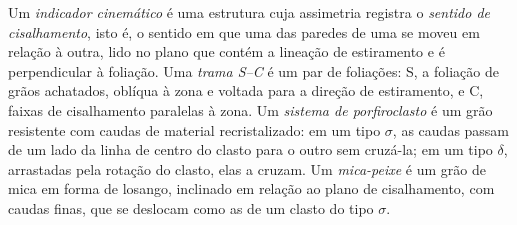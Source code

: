 \begin{definition}\label{def:b3:deformation-mechanisms:kinematic}
Um \emph{indicador cinemático} é uma estrutura cuja
assimetria registra o \emph{sentido de cisalhamento}, isto é, o sentido em
que uma das paredes de uma  se moveu em relação à outra, lido no plano
que contém a lineação de estiramento e é perpendicular à foliação.
Uma \emph{trama S--C} é um par de foliações: S, a
foliação de grãos achatados, oblíqua à zona e voltada para a
direção de estiramento, e C, faixas de cisalhamento paralelas à zona. Um
\emph{sistema de porfiroclasto} é um grão resistente com
caudas de material recristalizado: em um tipo $\sigma$, as caudas passam de um
lado da linha de centro do clasto para o outro sem cruzá-la; em um tipo
$\delta$, arrastadas pela rotação do clasto, elas a cruzam. Um
\emph{mica-peixe} é um grão de mica em forma de losango, inclinado em relação ao
plano de cisalhamento, com caudas finas, que se deslocam como as de um clasto do tipo $\sigma$.
\end{definition}

